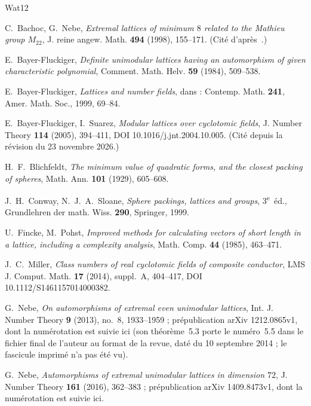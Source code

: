 \documentclass[11pt,a4paper]{amsart}
\theoremstyle{plain}
\theoremstyle{definition}
\numberwithin{equation}{section}
\begin{document}
\begin{thebibliography}{Wat12}

C.~Bachoc, G.~Nebe, \emph{Extremal lattices of minimum $8$ related to the Mathieu group $M_{22}$}, J. reine angew. Math. \textbf{494} (1998), 155--171. (Cité d'après~\cite{Sak26}.)

E.~Bayer-Fluckiger, \emph{Definite unimodular lattices having an automorphism of given characteristic polynomial}, Comment. Math. Helv. \textbf{59} (1984), 509--538.

E.~Bayer-Fluckiger, \emph{Lattices and number fields}, dans : Contemp. Math. \textbf{241}, Amer. Math. Soc., 1999, 69--84.

E.~Bayer-Fluckiger, I.~Suarez, \emph{Modular lattices over cyclotomic fields}, J. Number Theory \textbf{114} (2005), 394--411, DOI 10.1016/j.jnt.2004.10.005. (Cité depuis la révision du 23 novembre 2026.)

H.~F.~Blichfeldt, \emph{The minimum value of quadratic forms, and the closest packing of spheres}, Math. Ann. \textbf{101} (1929), 605--608.

J.~H.~Conway, N.~J.~A.~Sloane, \emph{Sphere packings, lattices and groups}, 3\textsuperscript{e}~éd., Grundlehren der math. Wiss. \textbf{290}, Springer, 1999.

U.~Fincke, M.~Pohst, \emph{Improved methods for calculating vectors of short length in a lattice, including a complexity analysis}, Math. Comp. \textbf{44} (1985), 463--471.

J.~C.~Miller, \emph{Class numbers of real cyclotomic fields of composite conductor}, LMS J. Comput. Math. \textbf{17} (2014), suppl.~A, 404--417, DOI 10.1112/S1461157014000382.

G.~Nebe, \emph{On automorphisms of extremal even unimodular lattices}, Int. J. Number Theory \textbf{9} (2013), no.~8, 1933--1959 ; prépublication arXiv 1212.0865v1, dont la numérotation est suivie ici (son théorème~5.3 porte le numéro~5.5 dans le fichier final de l'auteur au format de la revue, daté du 10 septembre 2014 ; le fascicule imprimé n'a pas été vu).

G.~Nebe, \emph{Automorphisms of extremal unimodular lattices in dimension $72$}, J. Number Theory \textbf{161} (2016), 362--383 ; prépublication arXiv 1409.8473v1, dont la numérotation est suivie ici.


\end{thebibliography}
\end{document}
